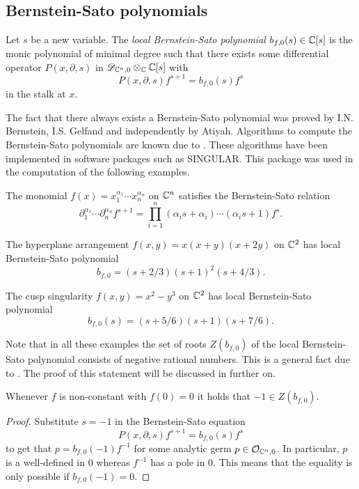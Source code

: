 \subsection{Bernstein-Sato polynomials}
\begin{definition}
  Let $s$ be a new variable.
  The {\it local Bernstein-Sato polynomial} $b_{f,0}(s)\in \mathbb{C}[s]$ is the monic polynomial of minimal degree such that there exists some differential operator $P(x,\partial,s)$ in $\mathscr{D}_{\mathbb{C}^n,0}\otimes_{\mathbb{C}}\mathbb{C}[s]$ with
  $$P(x,\partial,s) f^{s+1} = b_{f,0}(s) f^s$$
  in the stalk at $x$.
\end{definition}
The fact that there always exists a Bernstein-Sato polynomial was proved by I.N. Bernstein, I.S. Gelfand and independently by Atiyah.
Algorithms to compute the Bernstein-Sato polynomials are known due to \cite{oaku1997algorithm}.
These algorithms have been implemented in software packages such as SINGULAR.
This package was used in the computation of the following examples.
\begin{example}\label{ex: Monomial}
  The monomial $f(x) = x_1^{\alpha_1}\cdots x_n^{\alpha_n}$ on $\mathbb{C}^n$ satisfies the Bernstein-Sato relation
  $$\partial_1^{\alpha_1}\cdots \partial_n^{\alpha_n} f^{s+1} = \prod_{i=1}^n (\alpha_i s + \alpha_i)\cdots (\alpha_i s + 1) f^{s}. $$
\end{example}
\begin{example}
  The hyperplane arrangement $f(x,y) = x(x+y)(x+2y)$ on $\mathbb{C}^2$ has local Bernstein-Sato polynomial
  $$ b_{f,0} = (s+2/3)(s+1)^2(s+4/3).$$
\end{example}
\begin{example}\label{example: CuspBs}
  The cusp singularity $f(x,y) = x^2 - y^3$ on $\mathbb{C}^2$ has local Bernstein-Sato polynomial
  $$b_{f,0}(s) = (s+5/6)(s+1)(s+7/6).$$
\end{example}
Note that in all these examples the set of roots $Z(b_{f,0})$ of the local Bernstein-Sato polynomial consists of negative rational numbers.
This is a general fact due to \cite{kashiwara1976b}.
The proof of this statement will be discussed in further on.
\begin{proposition}
  Whenever $f$ is non-constant with $f(0)=0$ it holds that $-1\in Z(b_{f,0}).$
\end{proposition}
\begin{proof}
  Substitute $s = -1$ in the Bernstein-Sato equation
  $$P(x,\partial,s)f^{s+1} = b_{f,0}(s)f^s $$
  to get that $p = b_{f,0}(-1)f^{-1}$ for some analytic germ $p\in \mathcal{O}_{\mathbb{C}^n,0}$.
  In particular,  $p$ is a well-defined in $0$ whereas $f^{-1}$ has a pole in $0$.
  This means that the equality is only possible if $b_{f,0}(-1)=0$.
\end{proof}
